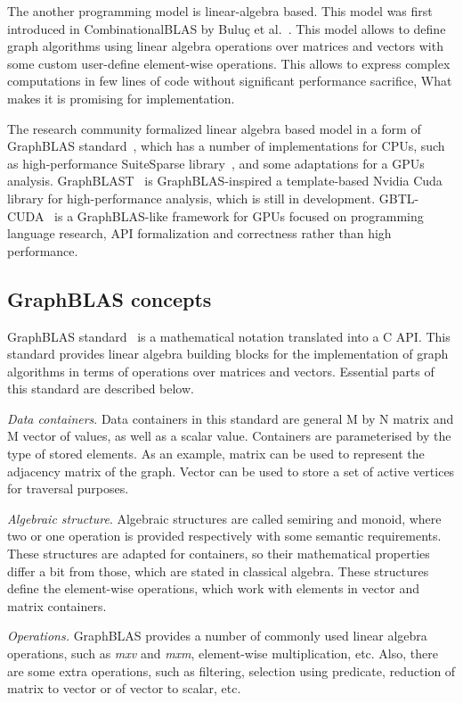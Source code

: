 The another programming model is linear-algebra based. This model was first introduced in CombinationalBLAS by Buluç et al.~\cite{article:combblas}. This model allows to define graph algorithms using linear algebra operations over matrices and vectors with some custom user-define element-wise operations. This allows to express complex computations in few lines of code without significant performance sacrifice, What makes it is promising for implementation. 

The research community formalized linear algebra based model in a form of GraphBLAS standard~\cite{7761646}, which has a number of implementations for CPUs, such as high-performance SuiteSparse library~\cite{10.1145/3322125}, and some adaptations for a GPUs analysis. GraphBLAST~\cite{yang2019graphblast} is GraphBLAS-inspired a template-based Nvidia Cuda library for high-performance analysis, which is still in development.
GBTL-CUDA~\cite{7529957} is a GraphBLAS-like framework for GPUs  focused on programming language research, API formalization and correctness rather than high performance. 

\subsection{GraphBLAS concepts}

GraphBLAS standard~\cite{7761646} is a mathematical notation translated into a C API. This standard provides linear algebra building blocks for the implementation of graph algorithms in terms of operations over matrices and vectors. Essential parts of this standard are described below.

\textit{Data containers}. Data containers in this standard are general M by N matrix and M vector of values, as well as a scalar value. Containers are parameterised by the type of stored elements. As an example, matrix can be used to represent the adjacency matrix of the graph. Vector can be used to store a set of active vertices for traversal purposes. 

\textit{Algebraic structure}. Algebraic structures are called semiring and monoid, where two or one operation is provided respectively with some semantic requirements. These structures are adapted for containers, so their mathematical properties differ a bit from those, which are stated in classical algebra. These structures define the element-wise operations, which work with elements in vector and matrix containers. 

\textit{Operations.} GraphBLAS provides a number of commonly used linear algebra operations, such as \textit{mxv} and \textit{mxm}, element-wise multiplication, etc. Also, there are some extra operations, such as filtering, selection using predicate, reduction of matrix to vector or of vector to scalar, etc.

